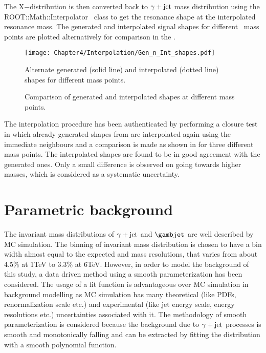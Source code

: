 The X$-$distribution is then converted back to $\gamma+\mathrm{jet}$ mass distribution using the ROOT::Math::Interpolator~\cite{Brun:1997pa} class
to get the resonance shape at the interpolated resonance mass. The generated and interpolated signal shapes for different \qstar\ mass points
are plotted alternatively for comparison in the \fig{\ref{fig:ResShapes}}. 

\begin{figure}[h]
\centering
\texttt{[image: Chapter4/Interpolation/Gen\_n\_Int\_shapes.pdf]}
\caption{Alternate generated (solid line) and interpolated (dotted line) shapes for different \qstar mass points.}
\label{fig:ResShapes}
\end{figure}

\begin{figure}[h]
\centering
{}
\caption{Comparison of generated and interpolated shapes at different \qstar mass points.}
\label{fig:ShapeComp}
\end{figure}

The interpolation procedure has been authenticated by performing a closure test in which already generated shapes from \pythia are interpolated again using
the immediate neighbours and a comparison is made as shown in \fig{\ref{fig:ShapeComp}} for three different \qstar mass points.
The interpolated shapes are found to be in good agreement with the generated ones. Only a small difference is observed on going towards higher masses, which is
considered as a systematic uncertainty.

\section{Parametric background}
The invariant mass distributions of $\gamma+\mathrm{jet}$ and $\gambjet$ are well described by MC simulation. The binning of invariant mass
distribution is chosen to have a bin width almost equal to the expected \qstar and \bstar mass resolutions, that varies from about 4.5$\%$ at
1\unit{TeV} to 3.3$\%$ at 6\unit{TeV}. However, in order to model the background of this study, a data driven method using a smooth parameterization
has been considered. The usage of a fit function is advantageous over MC simulation in background modelling as MC simulation has many theoretical
(like PDFs, renormalization scale etc.) and experimental (like jet energy scale, energy resolutions etc.) uncertainties associated with it. 
The methodology of smooth parameterization is considered because the background due to $\gamma+\mathrm{jet}$ processes is smooth and monotonically falling
and can be extracted by fitting the distribution with a smooth polynomial function. 

